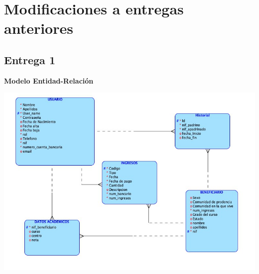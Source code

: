 \documentclass{article}
\date{}
\begin{document}

\begin{titlingpage}
\maketitle
\end{titlingpage}

\newpage

\tableofcontents

\newpage

\section{Modificaciones a entregas anteriores}

\subsection{Entrega 1}

\textbf{Modelo Entidad-Relación}

\begin{center}
\includegraphics[scale=0.5]{images/entidades.jpg}
\end{center}
\end{document}
